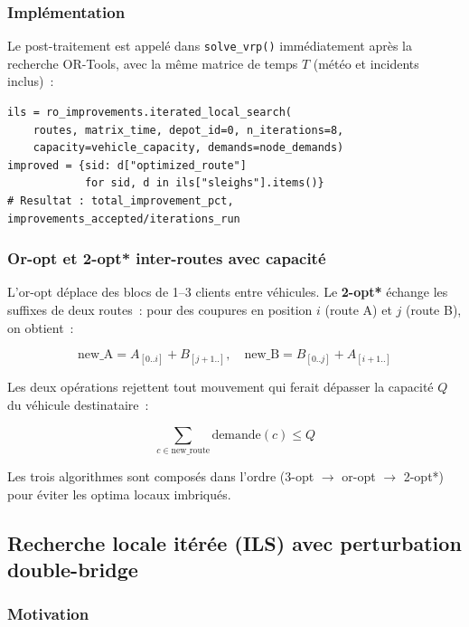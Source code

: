 \documentclass[a4paper, 12pt, twoside]{article}
\begin{document}
\subsubsection{Impl\'{e}mentation}

Le post-traitement est appel\'{e} dans \texttt{solve\_vrp()} imm\'{e}diatement apr\`{e}s la recherche OR-Tools, avec la m\^{e}me matrice de temps $T$ (m\'{e}t\'{e}o et incidents inclus)~:

\begin{lstlisting}[caption={Post-traitement ILS (double-bridge + pipeline 3-opt/or-opt/2-opt*)}, label=lst:postproc]
ils = ro_improvements.iterated_local_search(
    routes, matrix_time, depot_id=0, n_iterations=8,
    capacity=vehicle_capacity, demands=node_demands)
improved = {sid: d["optimized_route"]
            for sid, d in ils["sleighs"].items()}
# Resultat : total_improvement_pct, improvements_accepted/iterations_run
\end{lstlisting}

\subsubsection{Or-opt et 2-opt* inter-routes avec capacit\'{e}}

L'or-opt d\'{e}place des blocs de 1--3 clients entre v\'{e}hicules. Le \textbf{2-opt*} \'{e}change les suffixes de deux routes~: pour des coupures en position $i$ (route A) et $j$ (route B), on obtient~:

\[
\text{new\_A} = A_{[0..i]} + B_{[j+1..]}, \quad \text{new\_B} = B_{[0..j]} + A_{[i+1..]}
\]

Les deux op\'{e}rations rejettent tout mouvement qui ferait d\'{e}passer la capacit\'{e} $Q$ du v\'{e}hicule destinataire~:

\[
\sum_{c \in \text{new\_route}} \text{demande}(c) \leq Q
\]

Les trois algorithmes sont compos\'{e}s dans l'ordre (3-opt $\to$ or-opt $\to$ 2-opt*) pour \'{e}viter les optima locaux imbriqués.

\subsection{Recherche locale it\'{e}r\'{e}e (ILS) avec perturbation double-bridge}

\subsubsection{Motivation}
\end{document}
